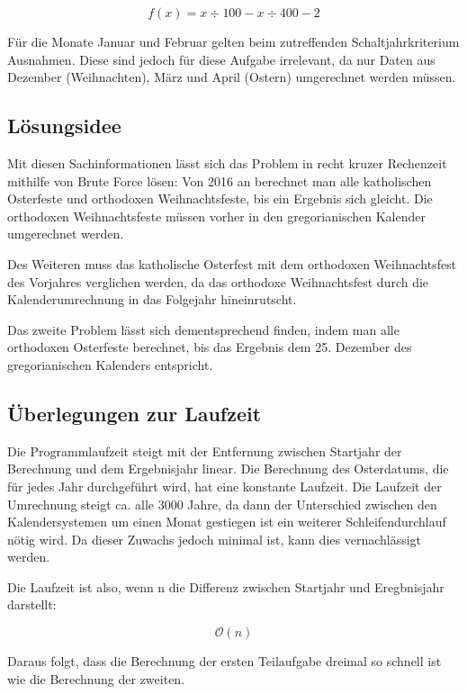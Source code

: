 	\[f(x)=x\div{}100-x\div{}400-2\]

	Für die Monate Januar und Februar gelten beim zutreffenden Schaltjahrkriterium Ausnahmen. Diese sind jedoch für diese Aufgabe irrelevant, da nur Daten aus Dezember (Weihnachten), März und April (Ostern) umgerechnet werden müssen.

\clearpage
\subsection {Lösungsidee}
	Mit diesen Sachinformationen lässt sich das Problem in recht kruzer Rechenzeit mithilfe von Brute Force lösen: Von 2016 an berechnet man alle katholischen Osterfeste und orthodoxen Weihnachtsfeste, bis ein Ergebnis sich gleicht. Die orthodoxen Weihnachtsfeste müssen vorher in den gregorianischen Kalender umgerechnet werden. 

	Des Weiteren muss das katholische Osterfest mit dem orthodoxen Weihnachtsfest des Vorjahres verglichen werden, da das orthodoxe Weihnachtsfest  durch die Kalenderumrechnung in das Folgejahr hineinrutscht.

	Das zweite Problem lässt sich dementsprechend finden, indem man alle orthodoxen Osterfeste berechnet, bis das Ergebnis dem 25. Dezember des gregorianischen Kalenders entspricht.

\subsection {Überlegungen zur Laufzeit}
Die Programmlaufzeit steigt mit der Entfernung zwischen Startjahr der Berechnung und dem Ergebnisjahr linear. Die Berechnung des Osterdatums, die für jedes Jahr durchgeführt wird, hat eine konstante Laufzeit. Die Laufzeit der Umrechnung steigt ca. alle 3000 Jahre, da dann der Unterschied zwischen den Kalendersystemen um einen Monat gestiegen ist ein weiterer Schleifendurchlauf nötig wird. Da dieser Zuwachs jedoch minimal ist, kann dies vernachlässigt werden.

Die Laufzeit ist also, wenn n die Differenz zwischen Startjahr und Eregbnisjahr darstellt:

\[\mathcal O(n)\]

Daraus folgt, dass die Berechnung der ersten Teilaufgabe dreimal so schnell ist wie die Berechnung der zweiten.